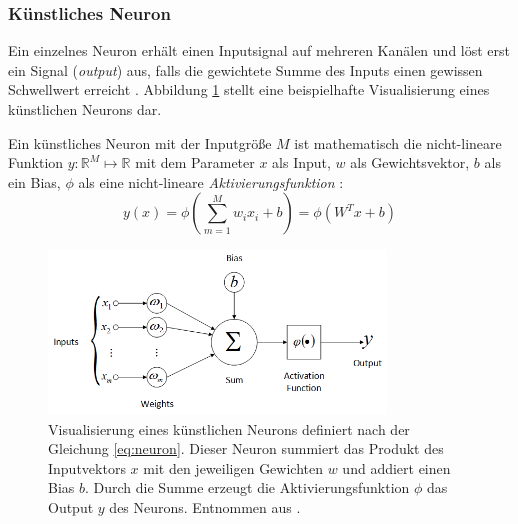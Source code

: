 \subsubsection{Künstliches Neuron}
Ein einzelnes Neuron erhält einen Inputsignal auf mehreren Kanälen und löst erst ein Signal (\textit{output}) aus, falls die gewichtete Summe des Inputs einen gewissen Schwellwert erreicht \cite{CS231nConvolutionalNeural}. Abbildung \ref{fig:neuron} stellt eine beispielhafte Visualisierung eines künstlichen Neurons dar.

Ein künstliches Neuron mit der Inputgröße $M$ ist mathematisch die nicht-lineare Funktion $y : \mathbb{R}^M \mapsto \mathbb{R}$ mit dem Parameter $x$ als Input, $w$ als Gewichtsvektor, $b$ als ein Bias, $\phi$ als eine nicht-lineare \textit{Aktivierungsfunktion} \cite{CS231nConvolutionalNeural}:
\begin{equation}
	\label{eq:neuron}
	y(x)=\phi\left(\sum_{m=1}^{M} w_{i} x_{i} + b\right) = \phi(W^Tx+b)
\end{equation}

\vspace*{0.5cm}

\begin{figure}[H]
	\centering
	\includegraphics[width=0.8\textwidth]{images/neuron.png}
	\caption{Visualisierung eines künstlichen Neurons definiert nach der Gleichung \ref{eq:neuron}. Dieser Neuron summiert das Produkt des Inputvektors $x$  mit den jeweiligen Gewichten $w$ und addiert einen Bias $b$. Durch die Summe erzeugt die Aktivierungsfunktion $\phi$ das Output $y$ des Neurons. Entnommen aus \cite{deoliveiraSystemBasedArtificial2017}. }
	\label{fig:neuron}
\end{figure}

